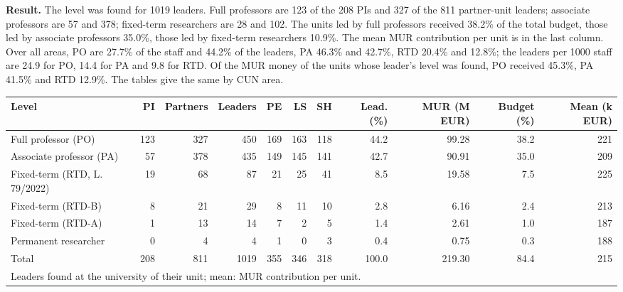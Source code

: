 \documentclass[11pt,a4paper]{article}
\begin{document}
\textbf{Result.} The level was found for 1019 leaders. Full professors are 123 of the 208 PIs and 327 of the 811 partner-unit leaders; associate professors are 57 and 378; fixed-term researchers are 28 and 102. The units led by full professors received 38.2\% of the total budget, those led by associate professors 35.0\%, those led by fixed-term researchers 10.9\%. The mean MUR contribution per unit is in the last column. Over all areas, PO are 27.7\% of the staff and 44.2\% of the leaders, PA 46.3\% and 42.7\%, RTD 20.4\% and 12.8\%; the leaders per 1000 staff are 24.9 for PO, 14.4 for PA and 9.8 for RTD. Of the MUR money of the units whose leader's level was found, PO received 45.3\%, PA 41.5\% and RTD 12.9\%. The tables give the same by CUN area.

\begin{table}[H]
\centering
\scriptsize\setlength{\tabcolsep}{2pt}
\begin{tabular}{lrrrrrrrrrr}
\toprule
Level & PI & Partners & Leaders & PE & LS & SH & Lead. (\%) & MUR (M EUR) & Budget (\%) & Mean (k EUR) \\
\midrule
Full professor (PO) & 123 & 327 & 450 & 169 & 163 & 118 & 44.2 & 99.28 & 38.2 & 221 \\
Associate professor (PA) & 57 & 378 & 435 & 149 & 145 & 141 & 42.7 & 90.91 & 35.0 & 209 \\
Fixed-term (RTD, L. 79/2022) & 19 & 68 & 87 & 21 & 25 & 41 & 8.5 & 19.58 & 7.5 & 225 \\
Fixed-term (RTD-B) & 8 & 21 & 29 & 8 & 11 & 10 & 2.8 & 6.16 & 2.4 & 213 \\
Fixed-term (RTD-A) & 1 & 13 & 14 & 7 & 2 & 5 & 1.4 & 2.61 & 1.0 & 187 \\
Permanent researcher & 0 & 4 & 4 & 1 & 0 & 3 & 0.4 & 0.75 & 0.3 & 188 \\
\midrule
Total & 208 & 811 & 1019 & 355 & 346 & 318 & 100.0 & 219.30 & 84.4 & 215 \\
\bottomrule
\multicolumn{11}{l}{\footnotesize Leaders found at the university of their unit; mean: MUR contribution per unit.} \\
\end{tabular}
\end{table}
\end{document}
